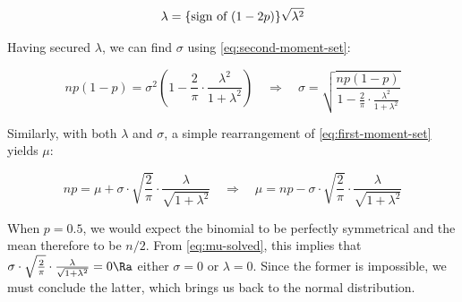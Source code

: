 \begin{equation}
  \label{eq:lambda-solved}
  \lambda = \textnormal{\{sign of $(1-2p)$\}} \sqrt{\lambda^2}
\end{equation}


Having secured $\lambda$, we can find $\sigma$ using
\eqref{eq:second-moment-set}:

\begin{equation}
  \label{eq:sigma-solved}
  np(1-p) = \sigma^2 \left( 1 - \frac{2}{\pi} \cdot \frac{\lambda^2}{1 + \lambda^2} \right) \quad\Rightarrow\quad
  \sigma = \sqrt{\frac{np(1-p)}{1 - \frac{2}{\pi} \cdot \frac{\lambda^2}{1 + \lambda^2}}}
\end{equation}

Similarly, with both $\lambda$ and $\sigma$, a simple rearrangement of
\eqref{eq:first-moment-set} yields $\mu$:

\begin{equation}
  \label{eq:mu-solved}
  np = \mu + \sigma \cdot \sqrt{\frac{2}{\pi}} \cdot \frac{\lambda}{\sqrt{1 + \lambda^2}} \quad\Rightarrow\quad
  \mu = np - \sigma \cdot \sqrt{\frac{2}{\pi}} \cdot \frac{\lambda}{\sqrt{1 + \lambda^2}}
\end{equation}

When $p = 0.5$, we would expect the binomial to be perfectly symmetrical and
the mean therefore to be $n/2$. From \eqref{eq:mu-solved}, this implies that
$\sigma \cdot \sqrt{\frac{2}{\pi}} \cdot \frac{\lambda}{\sqrt{1 + \lambda^2}} =
0 \Ra$ either $\sigma = 0$ or $\lambda = 0$. Since the former is impossible, we
must conclude the latter, which brings us back to the normal distribution.


